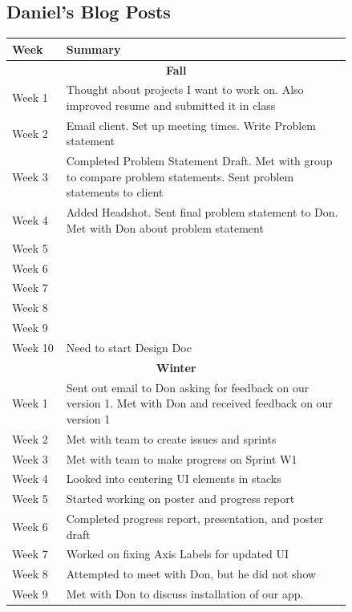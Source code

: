 \documentclass[onecolumn, draftclsnofoot,10pt, compsoc]{IEEEtran}
\begin{document}
\subsection{Daniel's Blog Posts}
\begin{center}
	\begin{longtable}{| l | p{0.84\linewidth}|}
		\hline
	Week & Summary \\ \hline
    \multicolumn{2}{c}{\textbf{Fall}} \\ \hline
    Week 1 & Thought about projects I want to work on. Also improved resume and submitted it in class  \\ \hline
	Week 2 & Email client. Set up meeting times. Write Problem statement \\ \hline
	Week 3 & Completed Problem Statement Draft. Met with group to compare problem statements. Sent problem statements to client \\ \hline
	Week 4 & Added Headshot. Sent final problem statement to Don. Met with Don about problem statement \\ \hline
    Week 5 &  \\ \hline
    Week 6 &  \\ \hline
	Week 7 &  \\ \hline
	Week 8 &  \\ \hline
	Week 9 &  \\ \hline
    Week 10 & Need to start Design Doc \\ \hline
    \multicolumn{2}{c}{\textbf{Winter}} \\ \hline
    Week 1 & Sent out email to Don asking for feedback on our version 1. Met with Don and received feedback on our version 1 \\ \hline
	Week 2 & Met with team to create issues and sprints \\ \hline
	Week 3 & Met with team to make progress on Sprint W1 \\ \hline
	Week 4 & Looked into centering UI elements in stacks \\ \hline
    Week 5 & Started working on poster and progress report \\ \hline
    Week 6 & Completed progress report, presentation, and poster draft \\ \hline
	Week 7 & Worked on fixing Axis Labels for updated UI \\ \hline
	Week 8 & Attempted to meet with Don, but he did not show \\ \hline
	Week 9 & Met with Don to discuss installation of our app. \\ \hline

\end{longtable}
\end{center}
\end{document}
